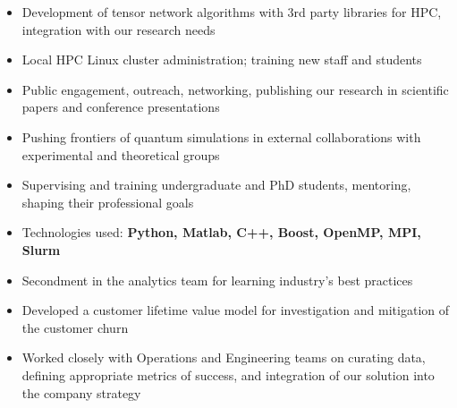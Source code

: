 \documentclass[10pt,a4paper,ragged2e,withhyper]{altacv}
\begin{document}
\begin{paracol}{2}
\begin{itemize}
    \item Development of tensor network algorithms with 3rd party libraries
    for HPC, integration with our research needs

    \item Local HPC Linux cluster administration;
    training new staff and students

    \item Public engagement, outreach, networking, publishing our research
    in scientific papers and conference presentations
    
    \item Pushing frontiers of quantum simulations in external collaborations
    with experimental and theoretical groups

    \item Supervising and training undergraduate and PhD students, mentoring,
    shaping their professional goals

    \item Technologies used:
    {\bf Python, Matlab, C++, Boost, OpenMP, MPI, Slurm}
\end{itemize}

\newpage



\begin{itemize}
    \item Secondment in the analytics team for learning industry's best
    practices
    
    \item Developed a customer lifetime value model for investigation and
    mitigation of the customer churn

    \item Worked closely with Operations and Engineering teams on curating data,
    defining appropriate metrics of success, and integration of our solution
    into the company strategy


\end{itemize}
\end{paracol}
\end{document}
